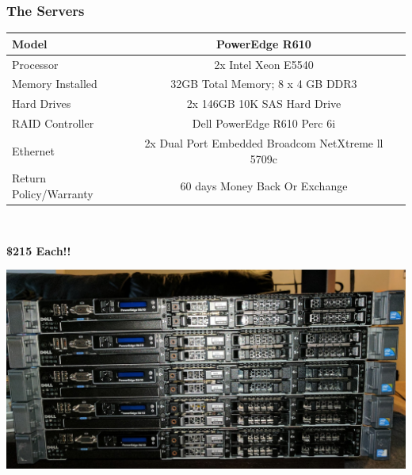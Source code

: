 \documentclass[aspectratio=169,11pt,hyperref={colorlinks=true}]{beamer}
\begin{document}
\begin{frame}
    \frametitle{The Servers}
    \begin{tabular}{ l c r }
        \hline
        Model &	PowerEdge R610 \\
        \hline
        Processor &	2x Intel Xeon E5540 \\
        \hline
        Memory Installed & 32GB Total Memory; 8 x 4 GB DDR3 \\
        \hline
        Hard Drives & 2x 146GB 10K SAS Hard Drive \\
        \hline
        RAID Controller & Dell PowerEdge R610 Perc 6i \\
        \hline
        Ethernet & 2x Dual Port Embedded Broadcom NetXtreme ll 5709c \\
        \hline
        Return Policy/Warranty & 60 days Money Back Or Exchange \\
        \hline
    \end{tabular}
    \\
    \begin{center}
        \Huge{\textbf{\$215 Each!!}}
    \end{center}
\end{frame}

\begin{frame}
    \includegraphics[width=\textwidth]{servers_delivered.jpg}  
\end{frame}
\end{document}
